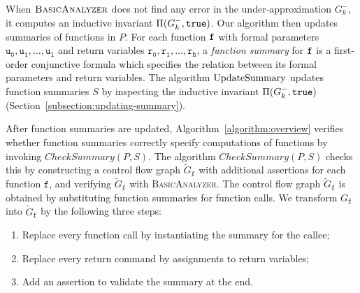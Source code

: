 When $\textsc{BasicAnalyzer}$ does not find any error in the
under-approximation $G^-_k$, it computes an inductive
invariant $\Pi (G^-_k, \mathtt{true})$. Our algorithm then updates
summaries of functions in $P$. For each function $\mathtt{{f}}$ with
formal parameters $\mathtt{u_0}, \mathtt{u_1}, \ldots, \mathtt{u_l}$
and return variables $\mathtt{r_0}, \mathtt{r_1}, \ldots, \mathtt{r_h}$, a \emph{function summary} for $\mathtt{{f}}$ is a
first-order conjunctive formula which specifies the relation between
its formal parameters and return variables. The algorithm
$\textmd{UpdateSummary}$ updates function summaries $S$ by inspecting
the inductive invariant $\Pi (G^-_k, \mathtt{true})$
(Section~\ref{subsection:updating-summary}). 

After function summaries are updated, Algorithm~\ref{algorithm:overview} 
verifies whether function summaries correctly specify computations of
functions by invoking $\mathit{CheckSummary} (P, S)$. The algorithm
$\mathit{CheckSummary} (P, S)$ checks this by constructing a control flow 
graph $\tilde{G}_{\mathtt{f}}$ with additional assertions for each
function $\mathtt{f}$, and verifying $\tilde{G}_{\mathtt{f}}$ with
\textsc{BasicAnalyzer}. The control flow graph
$\tilde{G}_{\mathtt{f}}$ is obtained by substituting function
summaries for function calls.
We transform $G_{\mathtt{f}}$ into $\tilde{G}_{\mathtt{f}}$ by the
following three steps:
\begin{enumerate}
\item Replace every function call by instantiating the summary for the
  callee;
\item Replace every return command by assignments to return variables;
\item Add an assertion to validate the summary at the end.
\end{enumerate}
